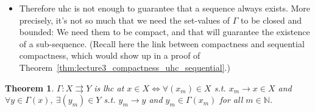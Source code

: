 \documentclass{article}
\newcommand{\R}{\mathbb{R}}
\newcommand{\N}{\mathbb{N}}
\newcommand{\toto}{\rightrightarrows}
\theoremstyle{mythm}
\newtheorem{theorem}{Theorem}
\theoremstyle{mydef}
\begin{document}
\begin{itemize}
    \begin{itemize}
      \item The figure on the left is uhc: Since the function is constant, if $\Gamma(x) \subseteq O$ for any $O$, then $\Gamma(y) = \Gamma(x) \subseteq O$ for every $y \in (0, \infty)$. Thus $\Gamma^{-1}(O) = \mathbb{R}_{++}$. However, for $1/n \to 0$ and $1 + 1/n \in \Gamma(1/n)$, $1 + 1/n \to 1 \notin \Gamma(0) = (1, 2)$.

      \item The figure on the right is also uhc: Take any open $O\subseteq \R$ that is bounded above, $\sup O > 0$, and either unbounded below or $\inf O < 0$ (the last 2 condition ensure $\Gamma^{-1}(O)\neq \varnothing$). Define $x_0 \in (0,\infty)$ such that 
      \begin{equation*}
          \frac{1}{x_0} = \sup O
      \end{equation*}
      Then $\Gamma^{-1}(O) = (x_0, \infty)$ because $1/x_0 \notin O$ (why?). Alternatively, if $O$ is open, unbounded above, and either unbounded below or $\inf O < 0$, then $\Gamma^{-1}(O) = \R_{++} = (0,\infty)$ which is open. However, take $\frac{1}{n} \to 0$ and $n\in \Gamma(1/n)$. We know that $n\to \infty$ and has no convergent subsequences. 
    \end{itemize}

  \item Therefore uhc is not enough to guarantee that a sequence always exists. More precisely, it's not so much that we need the set-values of $\Gamma$ to be closed and bounded: We need them to be compact, and that will guarantee the existence of a sub-sequence. (Recall here the link between compactness and sequential compactness, which would show up in a proof of Theorem~\ref{thm:lecture3_compactness_uhc_sequential}.)
\end{itemize}

\begin{theorem}\label{thm:lecture3_compactness_lhc_sequential}
  $\Gamma: X \toto Y$ is lhc at $x \in X \iff \forall (x_m) \in X$ s.t. $x_m \to x \in X$ and $\forall y \in \Gamma(x), ~ \exists (y_m) \in Y$ s.t. $y_m \to y$ and $y_m \in \Gamma(x_m)$ for all $m\in\N$. 
\end{theorem}
\end{document}
